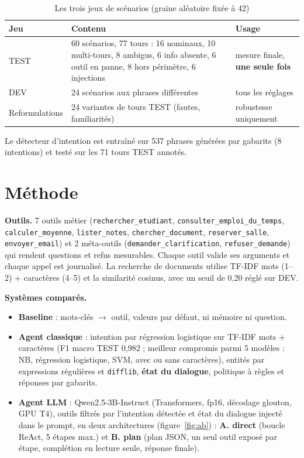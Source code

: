 \documentclass[10pt,a4paper]{article}
\begin{document}
\begin{table}[H]
\centering\small
\caption{Les trois jeux de scénarios (graine aléatoire fixée à 42)}
\label{tab:jeux}
\begin{tabularx}{\textwidth}{@{}lp{8.6cm}Y@{}}
\toprule
\textbf{Jeu} & \textbf{Contenu} & \textbf{Usage} \\
\midrule
TEST & 60 scénarios, 77 tours : 16 nominaux, 10 multi-tours, 8 ambigus, 6 info absente, 6 outil en panne, 8 hors périmètre, 6 injections & mesure finale, \textbf{une seule fois} \\
DEV & 24 scénarios aux phrases différentes & tous les réglages \\
Reformulations & 24 variantes de tours TEST (fautes, familiarités) & robustesse uniquement \\
\bottomrule
\end{tabularx}
\end{table}

Le détecteur d'intention est entraîné sur 537 phrases générées par gabarits (8 intentions) et testé sur les
71 tours TEST annotés.

\section{Méthode}
\sloppy
\textbf{Outils.} 7 outils métier (\texttt{rechercher\_etudiant}, \texttt{consulter\_emploi\_du\_temps},
\texttt{calculer\_moyenne}, \texttt{lister\_notes}, \texttt{chercher\_document}, \texttt{reserver\_salle},
\texttt{envoyer\_email}) et 2 méta-outils (\texttt{demander\_clarification}, \texttt{refuser\_demande}) qui rendent
questions et refus mesurables. Chaque outil valide ses arguments et chaque appel est journalisé.
La recherche de documents utilise TF-IDF mots (1--2) + caractères (4--5) et la similarité cosinus, avec un seuil de
0,20 réglé sur DEV.

\textbf{Systèmes comparés.}
\begin{itemize}
  \item \textbf{Baseline} : mots-clés $\rightarrow$ outil, valeurs par défaut, ni mémoire ni question.
  \item \textbf{Agent classique} : intention par régression logistique sur TF-IDF mots + caractères (F1 macro TEST
        0,982 ; meilleur compromis parmi 5 modèles : NB, régression logistique, SVM, avec ou sans caractères),
        entités par expressions régulières et \texttt{difflib}, \textbf{état du dialogue}, politique à règles et
        réponses par gabarits.
  \item \textbf{Agent LLM} : Qwen2.5-3B-Instruct (Transformers, fp16, décodage glouton, GPU T4), outils filtrés par
        l'intention détectée et état du dialogue injecté dans le prompt, en deux architectures (figure~\ref{fig:ab}) :
        \textbf{A. direct} (boucle ReAct, 5 étapes max.) et \textbf{B. plan} (plan JSON, un seul outil exposé par
        étape, complétion en lecture seule, réponse finale).
\end{itemize}
\end{document}
